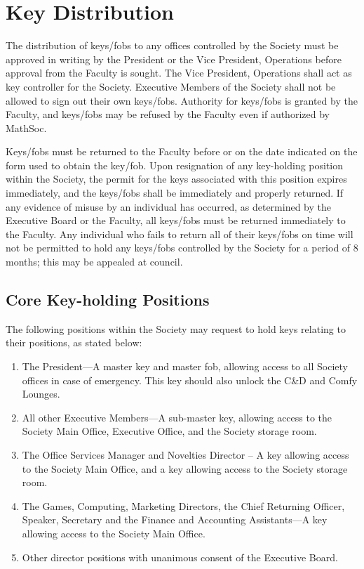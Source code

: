 \section{Key Distribution}
The distribution of keys/fobs to any offices controlled by the Society must be
approved in writing by the President or the Vice President, Operations before
approval from the Faculty is sought. The Vice President, Operations shall act
as key controller for the Society. Executive Members of the Society shall not
be allowed to sign out their own keys/fobs. Authority for keys/fobs is granted
by the Faculty, and keys/fobs may be refused by the Faculty even if authorized
by MathSoc.

Keys/fobs must be returned to the Faculty before or on the date indicated on
the form used to obtain the key/fob. Upon resignation of any key-holding
position within the Society, the permit for the keys associated with this
position expires immediately, and the keys/fobs shall be immediately and
properly returned. If any evidence of misuse by an individual has occurred, as
determined by the Executive Board or the Faculty, all keys/fobs must be
returned immediately to the Faculty. Any individual who fails to return all of
their keys/fobs on time will not be permitted to hold any keys/fobs controlled
by the Society for a period of 8 months; this may be appealed at council.

\subsection{Core Key-holding Positions}
The following positions within the Society may request to hold keys relating to
their positions, as stated below:
\begin{enumerate}
  \item The President---A master key and master fob, allowing access to all
    Society offices in case of emergency. This key should also unlock the C\&D
    and Comfy Lounges.
  \item All other Executive Members---A sub-master key, allowing access to the
    Society Main Office, Executive Office, and the Society storage room.
  \item The Office Services Manager and Novelties Director – A key allowing
    access to the Society Main Office, and a key allowing access to the Society
    storage room.
  \item The Games, Computing, Marketing Directors, the Chief Returning Officer,
    Speaker, Secretary and the Finance and Accounting Assistants---A key
    allowing access to the Society Main Office.
  \item Other director positions with unanimous consent of the Executive Board.
\end{enumerate}

